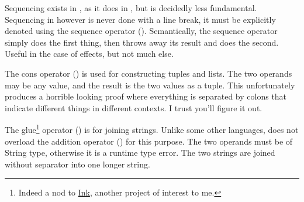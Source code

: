 \begin{prooftree}
\end{prooftree}

Sequencing exists in \Poetry{}, as it does in \Prose{}, but is decidedly less
fundamental. Sequencing in \Poetry{} however is never done with a line break,
it must be explicitly denoted using the sequence operator (\op{,}). Semantically,
the sequence operator simply does the first thing, then throws away its result
and does the second. Useful in the case of effects, but not much else.

\begin{prooftree}
\end{prooftree}

The cons operator (\op{:}) is used for constructing tuples and lists. The
two operands may be any value, and the result is the two values as a tuple.
This unfortunately produces a horrible looking proof where everything is
separated by colons that indicate different things in different contexts.
I trust you'll figure it out.

\begin{prooftree}
\end{prooftree}

The glue\footnote{Indeed a nod to \href{https://www.inklestudios.com/ink/}{Ink}, another
project of interest to me.} operator (\op{<>}) is for joining strings. Unlike some
other languages, \Trilogy{} does not overload the addition operator (\op{+}) for
this purpose. The two operands must be of String type, otherwise it is a runtime
type error. The two strings are joined without separator into one longer string.

\begin{prooftree}
\end{prooftree}

